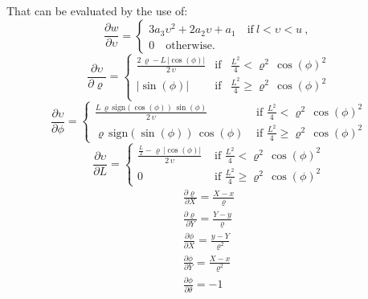 That can be evaluated by the use of:
\begin{equation}
     \frac{\partial w}{\partial \upsilon}=\begin{cases}
         3a_3\upsilon^2+2a_2\upsilon+a_1 \quad \text{if} \ l<\upsilon<u\ ,\\
         0 \quad \text{otherwise.}
    \end{cases}
\end{equation}
\begin{equation}
   \frac{\partial \upsilon}{\partial \varrho}= \left\{ \begin{array}{ccl} \frac{2\, \varrho - L\, \left|\cos\!\left(\phi\right)\right|}{2\, \upsilon} & \text{if} & \frac{L^2}{4} < {\varrho}^2\, {\cos\!\left(\phi\right)}^2\\ \left| \sin\!\left(\phi\right)\right| & \text{if} &  \frac{L^2}{4} \geq {\varrho}^2\, {\cos\!\left(\phi\right)}^2\\ \end{array} \right.
\end{equation}
\begin{equation}
   \frac{\partial \upsilon}{\partial \phi}=\left\{\begin{array}{cl} \frac{L\,\varrho \,\mathrm{sign}\left(\cos\left(\phi \right)\right)\,\sin\left(\phi \right)}{2\,\upsilon} & \text{\ if\ \ }\frac{L^2}{4}<\varrho ^2\,{\cos\left(\phi \right)}^2\\ \varrho \,\mathrm{sign}\left(\sin\left(\phi \right)\right)\,\cos\left(\phi \right) & \text{\ if\ \ } \frac{L^2}{4}\geq\varrho ^2\,{\cos\left(\phi \right)}^2 \end{array}\right.
\end{equation}
\begin{equation}
 \frac{\partial \upsilon}{\partial L}= 
    \left\{\begin{array}{cl} \frac{\frac{L}{2}-\varrho \,\left|\cos\left(\phi \right)\right|}{2\,\upsilon} & \text{\ if\ \ }\frac{L^2}{4}<\varrho ^2\,{\cos\left(\phi \right)}^2\\ 0 & \text{\ if\ \ } \frac{L^2}{4}\geq\varrho ^2\,{\cos\left(\phi \right)}^2 \end{array}\right.
\end{equation}
\begin{eqnarray}
\frac{\partial \varrho}{\partial X}=\frac{X-x}{\varrho}\\
\frac{\partial \varrho}{\partial Y}=\frac{Y-y}{\varrho}\\
\frac{\partial \phi}{\partial X}=\frac{y-Y}{\varrho^2}\\
\frac{\partial \phi}{\partial Y}=\frac{X-x}{\varrho^2}\\
\frac{\partial \phi}{\partial \theta}=-1
\end{eqnarray}
